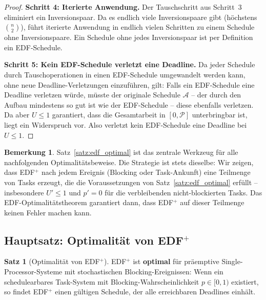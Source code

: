 ﻿\documentclass[a4paper,12pt]{article}
\theoremstyle{definition}
\newtheorem{satz}{Satz}
\newtheorem{bemerkung}{Bemerkung}
\begin{document}
\begin{proof}
		\medskip
		\textbf{Schritt 4: Iterierte Anwendung.}
		Der Tauschschritt aus Schritt~3 eliminiert ein Inversionspaar. Da es
		endlich viele Inversionspaare gibt (höchstens $\binom{n}{2}$), führt
		iterierte Anwendung in endlich vielen Schritten zu einem Schedule ohne
		Inversionspaare. Ein Schedule ohne jedes Inversionspaar ist per
		Definition ein EDF-Schedule.

		\medskip
		\textbf{Schritt 5: Kein EDF-Schedule verletzt eine Deadline.}
		Da jeder Schedule durch Tauschoperationen in einen EDF-Schedule
		umgewandelt werden kann, ohne neue Deadline-Verletzungen einzuführen,
		gilt: Falls ein EDF-Schedule eine Deadline verletzen würde, müsste
		der originale Schedule $\mathcal{A}$ -- der durch den Aufbau mindestens
		so gut ist wie der EDF-Schedule -- diese ebenfalls verletzen. Da aber
		$U \le 1$ garantiert, dass die Gesamtarbeit in $[0, \mathcal{P}]$
		unterbringbar ist, liegt ein Widerspruch vor.
		Also verletzt kein EDF-Schedule eine Deadline bei $U \le 1$.
	\end{proof}

	\begin{bemerkung}
		Satz~\ref{satz:edf_optimal} ist das zentrale Werkzeug für alle
		nachfolgenden Optimalitätsbeweise. Die Strategie ist stets dieselbe:
		Wir zeigen, dass EDF$^+$ nach jedem Ereignis (Blocking oder Task-Ankunft)
		eine Teilmenge von Tasks erzeugt, die die Voraussetzungen von
		Satz~\ref{satz:edf_optimal} erfüllt -- insbesondere $U' \le 1$ und
		$p' = 0$ für die verbleibenden nicht-blockierten Tasks. Das
		EDF-Optimalitätstheorem garantiert dann, dass EDF$^+$ auf dieser
		Teilmenge keinen Fehler machen kann.
	\end{bemerkung}

	\subsection{Hauptsatz: Optimalität von EDF$^+$}

	\begin{satz}[Optimalität von EDF$^+$]
		\label{satz:optimal}
		EDF$^+$ ist \textbf{optimal} für präemptive Single-Processor-Systeme mit
		stochastischen Blocking-Ereignissen: Wenn ein schedulearbares Task-System mit
		Blocking-Wahrscheinlichkeit $p \in [0,1)$ existiert, so findet EDF$^+$ einen
		gültigen Schedule, der alle erreichbaren Deadlines einhält.
	\end{satz}
\end{document}
